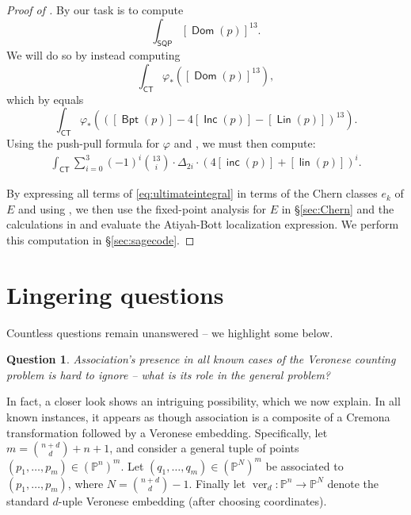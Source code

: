 \documentclass[reqno, 11pt]{amsart}
\theoremstyle{plain}
\newtheorem{question}[theorem]{Question}
\theoremstyle{remark}
\renewcommand{\P}{\mathbb{P}}
\DeclareMathOperator{\CT}{\mathsf{CT}}
\DeclareMathOperator{\SQP}{\mathsf{SQP}}
\DeclareMathOperator{\BP}{\mathsf{Bpt}}
\DeclareMathOperator{\Dom}{\mathsf{Dom}}
\DeclareMathOperator{\Lin}{\mathsf{Lin}}
\DeclareMathOperator{\Inc}{\mathsf{Inc}}
\DeclareMathOperator{\lin}{\mathsf{lin}}
\DeclareMathOperator{\inc}{\mathsf{inc}}
\DeclareMathOperator{\ver}{ver}
\begin{document}
\begin{proof}[Proof of ]
    By  our task is to compute \[\int_{\SQP} [\Dom(p)]^{13}.\] We will do so by instead computing \[\int_{\CT}\varphi_{*}\left([\Dom(p)]^{13}\right),\] which by  equals \[\int_{\CT}\varphi_{*}\left(([\BP(p)] - 4[\Inc(p)] - [\Lin(p)])^{13}\right).\]  Using the push-pull formula for $\varphi$ and , we must then compute:  
\begin{align}
\label{eq:ultimateintegral}
\int_{\CT} \sum_{i=0}^{3} (-1)^{i}{13 \choose i} \cdot \Delta_{2i} \cdot \left( 4 [\inc(p)]+[\lin(p)]\right)^{i}.
\end{align}

By expressing all terms of \eqref{eq:ultimateintegral} in terms of the Chern classes $e_{k}$ of $E$ and using , we then use the fixed-point analysis for $E$ in \S \ref{sec:Chern} and the calculations in  and evaluate the Atiyah-Bott localization expression.  We perform this computation in \S \ref{sec:sagecode}.

\end{proof}



\section{Lingering questions}
\label{sec:questions}

Countless questions remain unanswered -- we highlight some below.

\begin{question}
    \label{question:association}
    Association's presence in all known cases of the Veronese counting problem is hard to ignore -- what is its role in the general problem? 
\end{question}  

In fact, a closer look shows an intriguing possibility, which we now explain.  In all known instances, it appears as though association is a composite of a Cremona transformation followed by a Veronese embedding.  Specifically, let $m = {n+d \choose d} + n +1$, and consider a general tuple of points $(p_1, \dots, p_{m}) \in (\P^{n})^{m}$.  Let $(q_1, \dots, q_{m}) \in (\P^{N})^{m}$ be associated to $(p_{1}, \dots, p_{m})$, where $N = {n+d \choose d}-1$. Finally let $\ver_{d} :\P^{n} \to \P^{N}$ denote the standard $d$-uple Veronese embedding (after choosing coordinates).  
\end{document}
